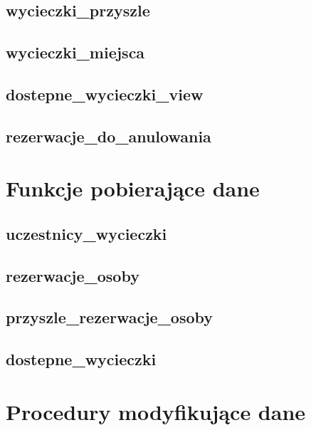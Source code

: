 \documentclass[12pt]{article}
\begin{document}
\subsection{wycieczki\_przyszle}


\subsection{wycieczki\_miejsca}


\subsection{dostepne\_wycieczki\_view}


\subsection{rezerwacje\_do\_anulowania}


\section{Funkcje pobierające dane}

\subsection{uczestnicy\_wycieczki}


\subsection{rezerwacje\_osoby}


\subsection{przyszle\_rezerwacje\_osoby}


\subsection{dostepne\_wycieczki}


\section{Procedury modyfikujące dane}
\end{document}
